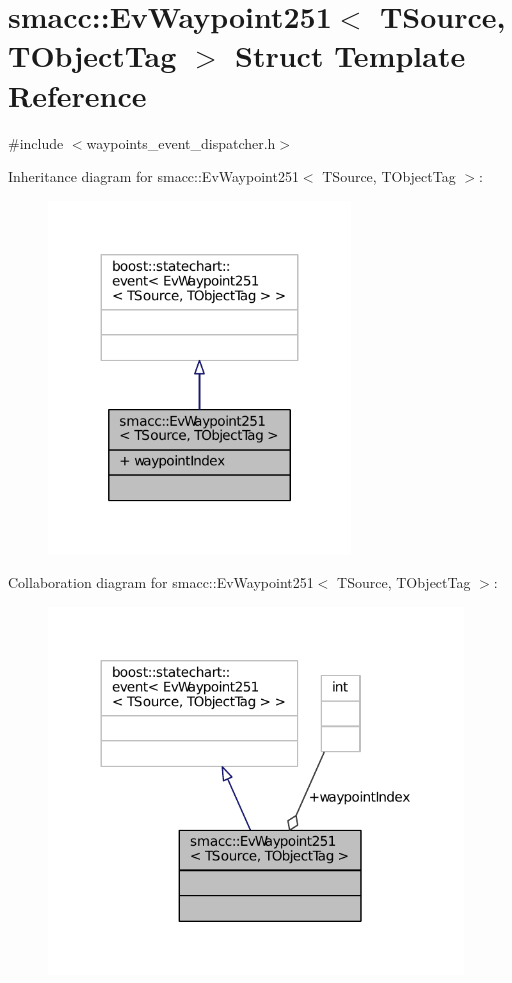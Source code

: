 \hypertarget{structsmacc_1_1EvWaypoint251}{}\section{smacc\+:\+:Ev\+Waypoint251$<$ T\+Source, T\+Object\+Tag $>$ Struct Template Reference}
\label{structsmacc_1_1EvWaypoint251}


{\ttfamily \#include $<$waypoints\+\_\+event\+\_\+dispatcher.\+h$>$}



Inheritance diagram for smacc\+:\+:Ev\+Waypoint251$<$ T\+Source, T\+Object\+Tag $>$\+:
\nopagebreak
\begin{figure}[H]
\begin{center}
\leavevmode
\includegraphics[width=227pt]{structsmacc_1_1EvWaypoint251__inherit__graph}
\end{center}
\end{figure}


Collaboration diagram for smacc\+:\+:Ev\+Waypoint251$<$ T\+Source, T\+Object\+Tag $>$\+:
\nopagebreak
\begin{figure}[H]
\begin{center}
\leavevmode
\includegraphics[width=312pt]{structsmacc_1_1EvWaypoint251__coll__graph}
\end{center}
\end{figure}

